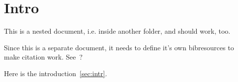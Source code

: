 \documentclass[10pt]{article}
\begin{document}
\section{Intro}\label{sec:intro}
This is a nested document, i.e. inside another folder, and should work, too.

Since this is a separate document, it needs to define it's own bibresources
to make citation work. See~\cite{shakebuild}?

Here is the introduction~\ref{sec:intr}.

\printbibliography
\end{document}
